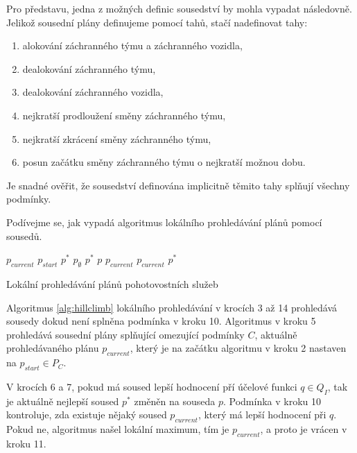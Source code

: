 \begin{exmp}\label{pr:sousedi}
Pro představu, jedna z možných definic sousedství by mohla vypadat následovně.
Jelikož sousední plány definujeme pomocí tahů, stačí nadefinovat tahy:
  \begin{enumerate}
    \item alokování záchranného týmu a záchranného vozidla,
    \item dealokování záchranného týmu,
    \item dealokování záchranného vozidla,
    \item nejkratší prodloužení směny záchranného týmu,
    \item nejkratší zkrácení směny záchranného týmu,
    \item posun začátku směny záchranného týmu o nejkratší možnou dobu.
  \end{enumerate}
\end{exmp}

Je snadné ověřit, že sousedství definována implicitně těmito tahy splňují všechny podmínky.

Podívejme se, jak vypadá algoritmus lokálního prohledávání plánů pomocí sousedů.

\begin{algorithm}[H]
  \begin{algorithmic}[1]
    \State $p_{current}$ \gets $p_{start}$
      \State $p^*$ \gets $p_{\emptyset}$ 
          \State $p^*$ \gets $p$
        \EndIf
      \EndFor
        \State \Return $p_{current}$
      \EndIf
      \State $p_{current}$ \gets $p^*$
    \EndWhile
  \EndFunction
  \end{algorithmic}
  \caption{Lokální prohledávání plánů pohotovostních služeb}
  \label{alg:hillclimb}
\end{algorithm}

Algoritmus \ref{alg:hillclimb} lokálního prohledávání v krocích 3 až 14 prohledává sousedy dokud není splněna podmínka v kroku 10.
Algoritmus v kroku 5 prohledává sousední plány splňující omezující podmínky $C$,
aktuálně prohledávaného plánu $p_{current}$, který je na začátku algoritmu v kroku 2 nastaven na $p_{start} \in P_C$.

V krocích 6 a 7, pokud má soused lepší hodnocení pří účelové funkci $q \in Q_I$, tak je aktuálně nejlepší soused $p^*$ změněn na souseda $p$.
Podmínka v kroku 10 kontroluje, zda existuje nějaký soused $p_{current}$, který má lepší hodnocení při $q$.
Pokud ne, algoritmus našel lokální maximum, tím je $p_{current}$, a proto je vrácen v kroku 11.

